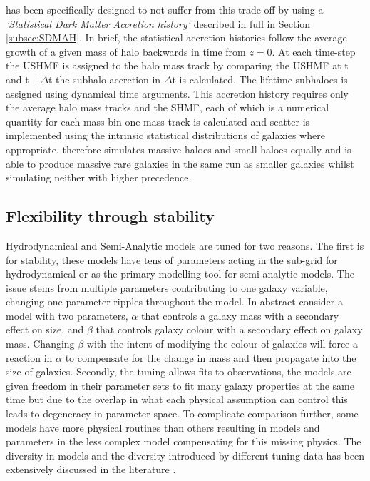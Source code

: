 \steel has been specifically designed to not suffer from this trade-off by using a \textit{'Statistical Dark Matter Accretion history`} described in full in Section \ref{subsec:SDMAH}. In brief, the statistical accretion histories follow the average growth of a given mass of halo backwards in time from $z = 0$. At each time-step the USHMF is assigned to the halo mass track by comparing the USHMF at t and t +$\Delta$t the subhalo accretion in $\Delta$t is calculated. The lifetime subhaloes is assigned using dynamical time arguments. This accretion history requires only the average halo mass tracks and the SHMF, each of which is a numerical quantity for each mass bin one mass track is calculated and scatter is implemented using the intrinsic statistical distributions of galaxies where appropriate. \steel therefore simulates massive haloes and small haloes equally and is able to produce massive rare galaxies in the same run as smaller galaxies whilst simulating neither with higher precedence.

\subsection{Flexibility through stability}
Hydrodynamical and Semi-Analytic models are tuned for two reasons. The first is for stability, these models have tens of parameters acting in the sub-grid for hydrodynamical or as the primary modelling tool for semi-analytic models. The issue stems from multiple parameters contributing to one galaxy variable, changing one parameter ripples throughout the model. In abstract consider a model with two parameters, $\alpha$ that controls a galaxy mass with a secondary effect on size, and $\beta$ that controls galaxy colour with a secondary effect on galaxy mass. Changing $\beta$ with the intent of modifying the colour of galaxies will force a reaction in $\alpha$ to compensate for the change in mass and then propagate into the size of galaxies. Secondly, the tuning allows fits to observations, the models are given freedom in their parameter sets to fit many galaxy properties at the same time but due to the overlap in what each physical assumption can control this leads to degeneracy in parameter space. To complicate comparison further, some models have more physical routines than others resulting in models and parameters in the less complex model compensating for this missing physics. The diversity in models and the diversity introduced by different tuning data has been extensively discussed in the literature \cite{Knebe2015NIFTyModels,Cui2018TheApplications,Knebe2018CosmicModels}.   

